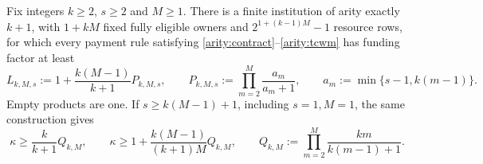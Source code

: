 \begin{theorem}
\label{arity:finite-bound}
Fix integers $k\geq2$, $s\geq2$ and $M\geq1$.  There is a finite institution
of arity exactly $k+1$, with $1+kM$ fixed fully eligible owners and
$2^{1+(k-1)M}-1$ resource rows, for which every payment rule satisfying
\eqref{arity:contract}--\eqref{arity:tcwm} has funding factor at least
\begin{equation}
  L_{k,M,s}
  :=1+\frac{k(M-1)}{k+1}P_{k,M,s},\qquad
  P_{k,M,s}:=\prod_{m=2}^{M}\frac{a_m}{a_m+1},\qquad
  a_m:=\min\{s-1,k(m-1)\}.
  \label{arity:finite-tail}
\end{equation}
Empty products are one.  If $s\geq k(M-1)+1$, including $s=1,M=1$, the
same construction gives
\begin{equation}
  \kappa\geq\frac{k}{k+1}Q_{k,M},\qquad
  \kappa\geq1+\frac{k(M-1)}{(k+1)M}Q_{k,M},\qquad
  Q_{k,M}:=\prod_{m=2}^{M}\frac{km}{k(m-1)+1}.
  \label{arity:untruncated}
\end{equation}
\end{theorem}

